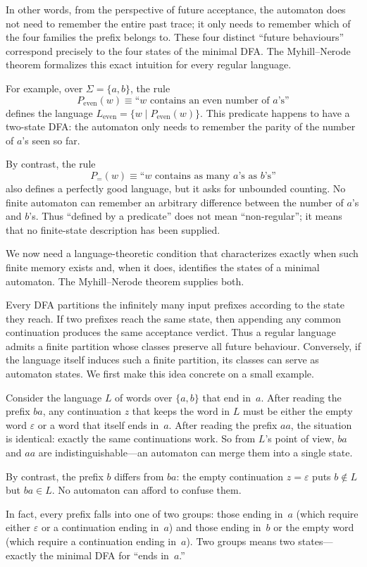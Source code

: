 In other words, from the perspective of future acceptance, the automaton does not need to remember the entire past trace; it only needs to remember which of the four families the prefix belongs to. These four distinct ``future behaviours'' correspond precisely to the four states of the minimal DFA. The Myhill--Nerode theorem formalizes this exact intuition for every regular language.

\begin{example}
\label{ex:predicate-versus-automaton}
For example, over $\Sigma=\{a,b\}$, the rule
\[
  P_{\mathrm{even}}(w) \equiv
  \text{``$w$ contains an even number of $a$'s''}
\]
defines the language $L_{\mathrm{even}}=\{w\mid P_{\mathrm{even}}(w)\}$.
This predicate happens to have a two-state DFA: the automaton only needs
to remember the parity of the number of $a$'s seen so far.

By contrast, the rule
\[
  P_{=}(w) \equiv
  \text{``$w$ contains as many $a$'s as $b$'s''}
\]
also defines a perfectly good language, but it asks for unbounded
counting.  No finite automaton can remember an arbitrary difference
between the number of $a$'s and $b$'s.  Thus ``defined by a predicate''
does not mean ``non-regular''; it means that no finite-state description
has been supplied.
\end{example}
We now need a language-theoretic condition that characterizes exactly
when such finite memory exists and, when it does, identifies the states
of a minimal automaton.  The Myhill--Nerode theorem supplies both.

Every DFA partitions the infinitely many input prefixes according to the
state they reach.  If two prefixes reach the same state, then appending
any common continuation produces the same acceptance verdict.  Thus a
regular language admits a finite partition whose classes preserve all
future behaviour.  Conversely, if the language itself induces such a
finite partition, its classes can serve as automaton states.  We first
make this idea concrete on a small example.

\begin{example}
\label{ex:myhill-nerode-preview}
Consider the language $L$ of words over $\{a,b\}$ that end in~$a$.
After reading the prefix $ba$, any continuation $z$ that keeps the word
in $L$ must be either the empty word $\varepsilon$ or a word that itself ends in~$a$.
After reading the prefix $aa$, the situation is identical: exactly the same continuations work. So from
$L$'s point of view, $ba$ and $aa$ are indistinguishable---an automaton
can merge them into a single state.

By contrast, the prefix $b$ differs from $ba$: the empty continuation
$z=\varepsilon$ puts $b\notin L$ but $ba\in L$.  No automaton can
afford to confuse them.

In fact, every prefix falls into one of two groups: those ending in~$a$
(which require either $\varepsilon$ or a continuation ending in~$a$) and
those ending in~$b$ or the empty word (which require a continuation
ending in~$a$). Two groups means two states---exactly the minimal DFA
for ``ends in~$a$.''
\end{example}

